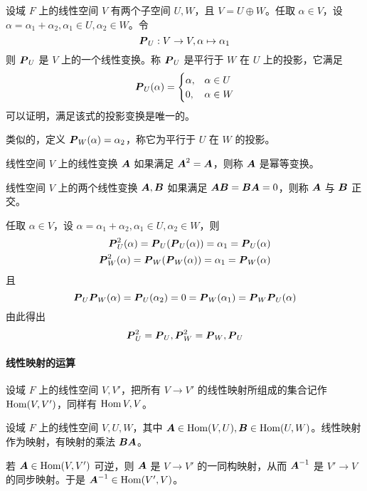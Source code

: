 设域 $F$ 上的线性空间 $V$ 有两个子空间 $U,W$，且 $V = U \oplus W$。任取 $\alpha \in V$，设 $\alpha = \alpha_1 + \alpha_2, \alpha_1 \in U, \alpha_2\in W$。令
\[ \boldsymbol{P}_U : V \to V, \alpha \mapsto \alpha_1 \]
则 $\boldsymbol{P}_U$ 是 $V$ 上的一个线性变换。称 $\boldsymbol{P}_U$ 是平行于 $W$ 在 $U$ 上的投影，它满足
\[ \boldsymbol{P}_U(\alpha) =
\begin{cases}
    \alpha,& \alpha \in U\\
    0 , & \alpha \in W
\end{cases} \]
可以证明，满足该式的投影变换是唯一的。

类似的，定义 $\boldsymbol{P}_W(\alpha) = \alpha_2$，称它为平行于 $U$ 在 $W$ 的投影。

\begin{definition}[幂等变换]
    线性空间 $V$ 上的线性变换 $\boldsymbol{A}$ 如果满足 $\boldsymbol{A}^2 = \boldsymbol{A}$，则称 $\boldsymbol{A}$ 是幂等变换。
\end{definition}

\begin{definition}
    线性空间 $V$ 上的两个线性变换 $\boldsymbol{A}, \boldsymbol{B}$ 如果满足 $\boldsymbol{A}\boldsymbol{B} = \boldsymbol{B}\boldsymbol{A} = 0$，则称 $\boldsymbol{A}$ 与 $\boldsymbol{B}$ 正交。
\end{definition}

任取 $\alpha\in V$，设 $\alpha = \alpha_1 + \alpha_2, \alpha_1 \in U, \alpha_2 \in W$，则
\begin{equation*}
    \begin{aligned}
        \boldsymbol{P}_U^2(\alpha) = \boldsymbol{P}_U(\boldsymbol{P}_U(\alpha)) = \alpha_1 = \boldsymbol{P}_U(\alpha)\\
        \boldsymbol{P}_W^2(\alpha) = \boldsymbol{P}_W(\boldsymbol{P}_W(\alpha)) = \alpha_1 = \boldsymbol{P}_W(\alpha)
    \end{aligned}
\end{equation*}
且
\[ \boldsymbol{P}_U\boldsymbol{P}_W(\alpha) = \boldsymbol{P}_U(\alpha_2) = 0 = \boldsymbol{P}_W(\alpha_1) = \boldsymbol{P}_W\boldsymbol{P}_U(\alpha) \]
由此得出
\[ \boldsymbol{P}_U^2 = \boldsymbol{P}_U, \boldsymbol{P}_W^2 = \boldsymbol{P}_W, \boldsymbol{P}_U \]

\paragraph{线性映射的运算}

设域 $F$ 上的线性空间 $V,V'$，把所有 $V \to V'$ 的线性映射所组成的集合记作 $\operatorname{Hom}(V,V')$，同样有 $\operatorname{Hom}{V,V}$。

设域 $F$ 上的线性空间 $V,U,W$，其中 $\boldsymbol{A} \in \operatorname{Hom}(V,U), \boldsymbol{B} \in \operatorname{Hom}(U,W)$。线性映射作为映射，有映射的乘法 $\boldsymbol{B}\boldsymbol{A}$。

若 $\boldsymbol{A}\in \operatorname{Hom}(V,V')$ 可逆，则 $\boldsymbol{A}$ 是 $V \to V'$ 的一同构映射，从而 $\boldsymbol{A}^{-1}$ 是 $V' \to V$ 的同步映射。于是 $\boldsymbol{A}^{-1} \in \operatorname{Hom}(V',V)$。

